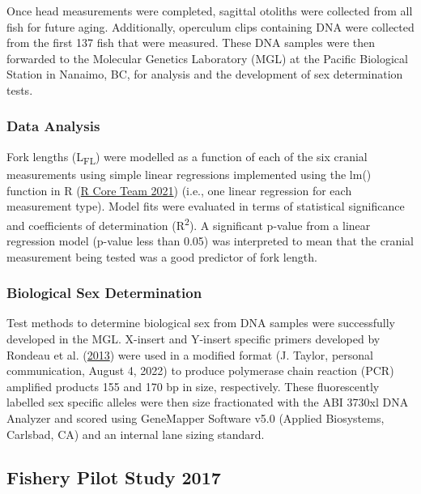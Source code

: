 \documentclass[12pt]{article}\usepackage[]{graphicx}\usepackage[]{color}
\begin{document}
Once head measurements were completed, sagittal otoliths were collected from all fish for future aging. Additionally, operculum clips containing DNA were collected from the first 137 fish that were measured. These DNA samples were then forwarded to the Molecular Genetics Laboratory (MGL) at the Pacific Biological Station in Nanaimo, BC, for analysis and the development of sex determination tests.

\hypertarget{data-analysis}{%
\subsubsection{Data Analysis}\label{data-analysis}}

Fork lengths (L\textsubscript{FL}) were modelled as a function of each of the six cranial measurements using simple linear regressions implemented using the lm() function in R (\protect\hyperlink{ref-R}{R Core Team 2021}) (i.e., one linear regression for each measurement type). Model fits were evaluated in terms of statistical significance and coefficients of determination (R\textsuperscript{2}). A significant p-value from a linear regression model (p-value less than 0.05) was interpreted to mean that the cranial measurement being tested was a good predictor of fork length.

\hypertarget{biological-sex-determination}{%
\subsubsection{Biological Sex Determination}\label{biological-sex-determination}}

Test methods to determine biological sex from DNA samples were successfully developed in the MGL. X-insert and Y-insert specific primers developed by Rondeau et al. (\protect\hyperlink{ref-Rondeau2013}{2013}) were used in a modified format (J. Taylor, personal communication, August 4, 2022) to produce polymerase chain reaction (PCR) amplified products 155 and 170 bp in size, respectively. These fluorescently labelled sex specific alleles were then size fractionated with the ABI 3730xl DNA Analyzer and scored using GeneMapper Software v5.0 (Applied Biosystems, Carlsbad, CA) and an internal lane sizing standard.

\hypertarget{fishery-pilot-study-2017}{%
\subsection{Fishery Pilot Study 2017}\label{fishery-pilot-study-2017}}
\end{document}
